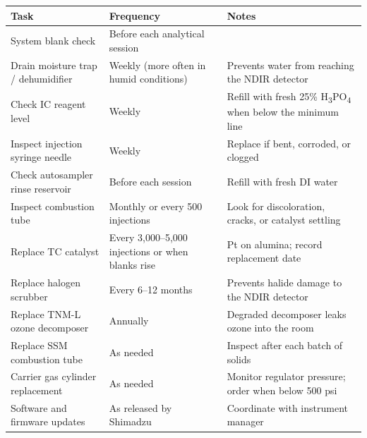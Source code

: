 \documentclass[
  11pt,
  letterpaper,
]{article}
\newcounter{none} %
\begin{document}
{\def\LTcaptype{none} %
\begin{longtable}[]{@{}
  >{\raggedright\arraybackslash}p{}
  >{\raggedright\arraybackslash}p{}
  >{\raggedright\arraybackslash}p{}@{}}
\toprule\noalign{}
\begin{minipage}[b]{\linewidth}\raggedright
Task
\end{minipage} & \begin{minipage}[b]{\linewidth}\raggedright
Frequency
\end{minipage} & \begin{minipage}[b]{\linewidth}\raggedright
Notes
\end{minipage} \\
\midrule\noalign{}
\endhead
\bottomrule\noalign{}
\endlastfoot
System blank check & Before each analytical session & \\
Drain moisture trap / dehumidifier & Weekly (more often in humid
conditions) & Prevents water from reaching the NDIR detector \\
Check IC reagent level & Weekly & Refill with fresh 25\%
H\textsubscript{3}PO\textsubscript{4} when below the minimum line \\
Inspect injection syringe needle & Weekly & Replace if bent, corroded,
or clogged \\
Check autosampler rinse reservoir & Before each session & Refill with
fresh DI water \\
Inspect combustion tube & Monthly or every 500 injections & Look for
discoloration, cracks, or catalyst settling \\
Replace TC catalyst & Every 3,000--5,000 injections or when blanks rise
& Pt on alumina; record replacement date \\
Replace halogen scrubber & Every 6--12 months & Prevents halide damage
to the NDIR detector \\
Replace TNM-L ozone decomposer & Annually & Degraded decomposer leaks
ozone into the room \\
Replace SSM combustion tube & As needed & Inspect after each batch of
solids \\
Carrier gas cylinder replacement & As needed & Monitor regulator
pressure; order when below 500 psi \\
Software and firmware updates & As released by Shimadzu & Coordinate
with instrument manager \\
\end{longtable}
}
\end{document}
